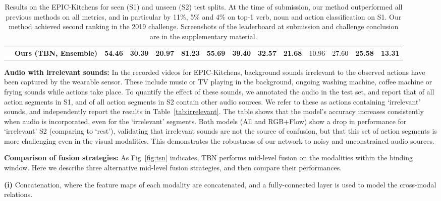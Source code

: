 \documentclass[10pt,twocolumn,letterpaper]{article}
\begin{document}
\begin{table*}[t]
\begin{center}
{\begin{tabular}{ll|ccc|ccc|ccc|ccc}
                        & \textbf{Ours (TBN, Ensemble)} & \textbf{54.46} & \textbf{30.39} & \textbf{20.97} & \textbf{81.23} & \textbf{55.69} & \textbf{39.40} & \textbf{32.57} & \textbf{21.68} & 10.96 & 27.60 & \textbf{25.58} & \textbf{13.31}\\

\end{tabular}}
\caption{Results on the EPIC-Kitchens for seen (S1) and unseen (S2) test splits. At the time of submission, our method outperformed all previous methods on all metrics, and in particular by 11\%, 5\% and 4\% on top-1 verb, noun and action classification on S1. Our method achieved second ranking in the 2019 challenge. Screenshots of the leaderboard at submission and challenge conclusion are in the supplementary material.}
\label{tab:resultsF}
\end{center}
\end{table*}

 
\noindent \textbf{Audio with irrelevant sounds:} In the recorded videos for EPIC-Kitchens, background sounds irrelevant to the observed actions have been captured by the wearable sensor.
These include music or TV playing in the background, ongoing washing machine, coffee machine or frying sounds while actions take place. 
To quantify the effect of these sounds, we annotated the audio in the test set, and report that  of all action segments in S1, and  of all action segments in S2 contain other audio sources. We refer to these as actions containing `irrelevant' sounds, and independently report the results in Table~\ref{tab:irrelevant}. 
The table shows that the model's accuracy increases consistently when audio is incorporated, even for the `irrelevant' segments.
Both models (All and RGB+Flow) show a drop in performance for `irrelevant' S2 (comparing to `rest'), validating that irrelevant sounds are not the source of confusion, but that this set of action segments is more challenging even in the visual modalities.
This demonstrates the robustness of our network to noisy and unconstrained audio sources.



\noindent\textbf{Comparison of fusion strategies: }As Fig~\ref{fig:tsn} indicates, TBN performs mid-level fusion on the modalities within the binding window.
Here we describe three alternative mid-level fusion strategies, and then compare their performances.

\noindent \textbf{(i)} {Concatenation}, where the feature maps of each modality are concatenated, and a fully-connected layer is used to model the cross-modal relations.
\end{document}
